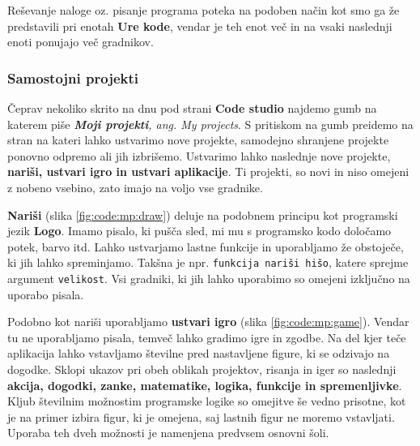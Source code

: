 Reševanje naloge oz. pisanje programa poteka na podoben način kot smo
ga že predstavili pri enotah \textbf{Ure kode}, vendar je teh enot več
in na vsaki naslednji enoti ponujajo več gradnikov.

\subsubsection{Samostojni projekti}
\label{sec:gradnja-projektov}

Čeprav nekoliko skrito na dnu pod strani \textbf{Code studio} najdemo
gumb na katerem piše \emph{\textbf{Moji projekti}, ang. My
  projects}. S pritiskom na gumb preidemo na stran na kateri lahko
ustvarimo nove projekte, samodejno shranjene projekte ponovno odpremo
ali jih izbrišemo. Ustvarimo lahko naslednje nove projekte,
\textbf{nariši, ustvari igro in ustvari aplikacije}. Ti projekti, so
novi in niso omejeni z nobeno vsebino, zato imajo na voljo vse
gradnike.

\textbf{Nariši} (slika \ref{fig:code:mp:draw}) deluje na podobnem
principu kot programski jezik \textbf{Logo}. Imamo pisalo, ki pušča
sled, mi mu s programsko kodo določamo potek, barvo itd. Lahko
ustvarjamo lastne funkcije in uporabljamo že obstoječe, ki jih lahko
spreminjamo. Takšna je npr. \texttt{funkcija nariši hišo}, katere
sprejme argument \texttt{velikost}. Vsi gradniki, ki jih lahko
uporabimo so omejeni izključno na uporabo pisala. 

Podobno kot nariši uporabljamo \textbf{ustvari igro} (slika
\ref{fig:code:mp:game}). Vendar tu ne uporabljamo pisala, temveč lahko
gradimo igre in zgodbe. Na del kjer teče aplikacija lahko vstavljamo
številne pred nastavljene figure, ki se odzivajo na dogodke. Sklopi
ukazov pri obeh oblikah projektov, risanja in iger so naslednji
\textbf{akcija, dogodki, zanke, matematike, logika, funkcije in
  spremenljivke}. Kljub številnim možnostim programske logike so
omejitve še vedno prisotne, kot je na primer izbira figur, ki je
omejena, saj lastnih figur ne moremo vstavljati. Uporaba teh dveh
možnosti je namenjena predvsem osnovni šoli.

